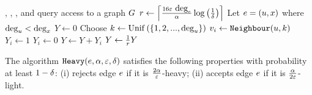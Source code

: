 \begin{algorithm}[ht!]
    \caption{\heavyoracle($\edge$,$\arboricity$,$\approxerror$,$\confidence$)}\label{Algorithm: Heavy Oracle}
    \begin{algorithmic}[1]
        \Require \degreeq{}, \neighbourq{}, \edgeexistsq{}, and \randedgeq{} query access to a graph $G$
        \State $r \gets \left\lceil{\frac{16\varepsilon~ \mbox{deg}_{e}}{\alpha}\log\left({\frac{1}{\delta}}\right)}\right\rceil$ 
        \State Let $e = (u, x)$ where $\mbox{deg}_{u} < \mbox{deg}_{x}$
        \State $Y \gets 0$
            \State Choose $k \gets \mathrm{Unif}\left({\left\{{1,2,...,\mbox{deg}_{u}}\right\}}\right)$
            \State $v_i \gets \texttt{Neighbour}(u,k)$ 
             
                \State $Y_i \gets 1$ 
            \Else
                \State $Y_i \gets 0$
            \EndIf
            \State $Y  \gets Y + Y_i$
        \EndFor
        \State $Y \gets \frac{1}{r}Y$
            \State {}
        \Else
            \State {}
        \EndIf
    \end{algorithmic}
\end{algorithm}
\begin{lemma}\label{Lemma: Heavy Oracle Algorithm Correctness}
    The algorithm $\texttt{Heavy}{\left({e,\alpha,\varepsilon,\delta}\right)}$ satisfies the following properties with probability at least $1-\delta$: (i) rejects edge $\edge$ if it is $\frac{2\alpha}{\varepsilon}$-heavy; (ii) accepts edge $\edge$ if it is $\frac{\alpha}{2\varepsilon}$-light.
\end{lemma}

